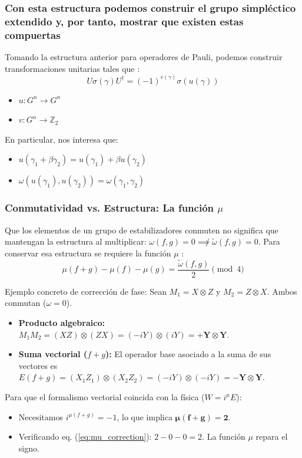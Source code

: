 \begin{frame}
  \frametitle{Con esta estructura podemos construir el grupo simpléctico extendido y, por tanto, mostrar que existen estas compuertas}

  Tomando la estructura anterior para operadores de Pauli, podemos construir transformaciones unitarias tales que \citep{Cesar2024}:
  \begin{equation}
    U \sigma(\gamma) U^\dagger = (-1)^{v(\gamma)}\sigma(u(\gamma))
    \label{eq:ESp2}
  \end{equation}
  \begin{itemize}
    \item $u : G^n \to G^n$
    \item $v : G^n \to \mathbb{Z}_2$
  \end{itemize}

  En particular, nos interesa que:
  \begin{itemize}
    \item $u(\gamma_1 + \beta \gamma_2) = u(\gamma_1) + \beta u(\gamma_2)$
    \item $\omega(u(\gamma_1), u(\gamma_2)) = \omega(\gamma_1, \gamma_2)$
  \end{itemize}

\end{frame}

\begin{frame}
  \frametitle{Conmutatividad vs. Estructura: La función $\mu$}

  Que los elementos de un grupo de estabilizadores conmuten no significa que mantengan la estructura al multiplicar: $\omega(f, g) = 0 \not\implies \tilde{\omega}(f, g) = 0$. Para conservar esa estructura se requiere la función $\mu$ \citep{Cesar2024}:
  \begin{equation}
    \mu(f + g) - \mu(f) - \mu(g) = \frac{\tilde{\omega}(f, g)}{2} \pmod 4
    \label{eq:mu_correction}
  \end{equation}

  \begin{block}{Ejemplo concreto de corrección de fase:}
    Sean $M_1 = X \otimes Z$ y $M_2 = Z \otimes X$. Ambos conmutan ($\omega=0$).
    \begin{itemize}
      \item \textbf{Producto algebraico:} $M_1 M_2 = (XZ) \otimes (ZX) = (-iY) \otimes (iY) = \mathbf{+Y \otimes Y}$.
      \item \textbf{Suma vectorial ($f+g$):} El operador base asociado a la suma de sus vectores es $E(f+g) = (X_1 Z_1) \otimes (X_2 Z_2) = (-iY) \otimes (-iY) = \mathbf{-Y \otimes Y}$.
    \end{itemize}
    Para que el formalismo vectorial coincida con la física ($W = i^\mu E$):
    \begin{itemize}
      \item Necesitamos $i^{\mu(f+g)} = -1$, lo que implica $\mathbf{\mu(f+g) = 2}$.
      \item Verificando eq. (\ref{eq:mu_correction}): $2 - 0 - 0 = 2$. La función $\mu$ repara el signo.
    \end{itemize}
  \end{block}

\end{frame}

